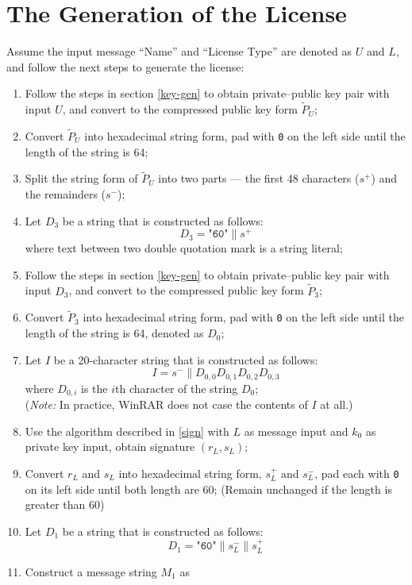 \documentclass[oneside]{article}
\begin{document}
\section{The Generation of the License}
Assume the input message ``Name'' and ``License Type'' are denoted as $U$ and $L$, and follow the next steps to generate the license:
\begin{enumerate}
      \item Follow the steps in section \ref{key-gen} to obtain private--public key pair with input $U$, and convert to the compressed public key form $\tilde{P}_U$;
      \item Convert $\tilde{P}_U$ into hexadecimal string form, pad with \texttt{0} on the left side until the length of the string is 64;
      \item Split the string form of $\tilde{P}_U$ into two parts --- the first 48 characters ($s^+$) and the remainders ($s^-$);
      \item Let $D_3$ be a string that is constructed as follows:
            \[D_3=\texttt{"60"}\parallel s^+\]
            where text between two double quotation mark is a string literal;
      \item Follow the steps in section \ref{key-gen} to obtain private--public key pair with input $D_3$, and convert to the compressed public key form $\tilde{P}_3$;
      \item Convert $\tilde{P}_3$ into hexadecimal string form, pad with \texttt{0} on the left side until the length of the string is 64, denoted as $D_0$;
      \item Let $I$ be a 20-character string that is constructed as follows:
            \[I=s^-\parallel D_{0,0}D_{0,1}D_{0,2}D_{0,3}\]
            where $D_{0,i}$ is the $i$th character of the string $D_0$;\\
            (\emph{Note:} In practice, WinRAR does not case the contents of $I$ at all.)
      \item Use the algorithm described in \ref{sign} with $L$ as message input and $k_0$ as private key input, obtain signature $\left(r_L,s_L\right)$;
      \item Convert $r_L$ and $s_L$ into hexadecimal string form, $s_L^+$ and $s_L^-$, pad each with \texttt{0} on its left side until both length are 60; (Remain unchanged if the length is greater than 60)
      \item Let $D_1$ be a string that is constructed as follows:
            \[D_1=\texttt{"60"}\parallel s_L^-\parallel s_L^+\]
      \item Construct a message string $M_1$ as

\end{enumerate}
\end{document}
